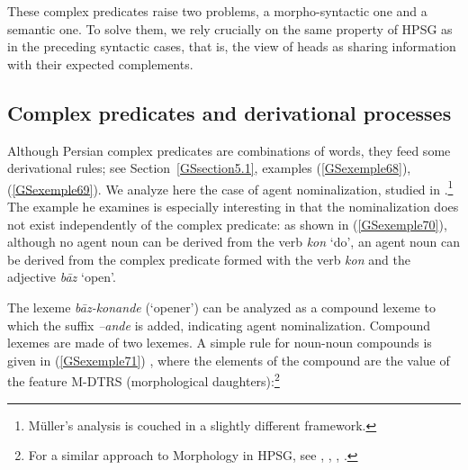 \documentclass[output=paper
	        ,collection
	        ,collectionchapter
 	        ,biblatex
                ,babelshorthands
                ,newtxmath
                ,draftmode
                ,colorlinks, citecolor=brown
]{langscibook}
\begin{document}
{These complex predicates raise two problems, a morpho-syntactic one and a semantic one. To solve them, we rely crucially on the same property of HPSG as in the preceding syntactic cases, that is, the view of heads as sharing information with their expected complements. 

\subsection{Complex predicates and derivational processes}\label{GSsection5.2}

Although Persian complex predicates are combinations of words, they feed some derivational rules; see Section~\ref{GSsection5.1}, examples (\ref{GSexemple68}), (\ref{GSexemple69}). We analyze here the case of agent nominalization, studied in \cite{MuellerPersian-unlinked}.\footnote{Müller’s analysis is couched in a slightly different framework.} The example he examines is especially interesting in that the nominalization does not exist independently of the complex predicate: as shown in (\ref{GSexemple70}), although no agent noun can be derived from the verb \emph{kon} `do', an agent noun can be derived from the complex predicate formed with the verb \emph{kon} and the adjective \emph{b\=az} `open'.


\begin{exe}
\end{exe}

The lexeme \emph{b\=az-konande} (`opener') can be analyzed as a compound lexeme to which the suffix \emph{–ande} is added, indicating agent nominalization. Compound lexemes are made of two lexemes. A simple rule for noun-noun compounds is given in (\ref{GSexemple71}) \citep[178]{bonami2018lexeme}, where the elements of the compound are the value of the feature M-DTRS (morphological daughters):\footnote{For a similar approach to Morphology in HPSG, see \cite{Orgun96a}, \cite{Riehemann98a}, \cite{Koenig99a}, \cite{sag2003syntactic}.}

\begin{exe}
\end{exe}

}
\end{document}
